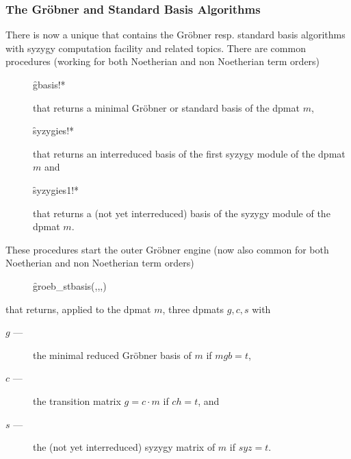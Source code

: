 \subsubsection{The Gr\"obner and Standard Basis Algorithms}

There is now a unique  that contains the Gr\"obner
resp. standard basis algorithms with syzygy computation facility and
related topics. There are common procedures (working for both
Noetherian and non Noetherian term orders)
\begin{description}

\item[]
  \begin{syntax}
    \f{gbasis!*} 
  \end{syntax}
  \hypertarget{procedure:GBASIS!*}{}
that returns a minimal Gr\"obner or standard basis of the dpmat $m$,

\item[]
  \begin{syntax}
    \f{syzygies!*} 
  \end{syntax}
  \hypertarget{procedure:SYZYGIES!*}{}
that returns an interreduced basis of the first syzygy module of
the dpmat $m$ and

\item[]
  \begin{syntax}
    \f{syzygies1!*} 
  \end{syntax}
  \hypertarget{procedure:SYZYGIES1!*}{}
that returns a (not yet interreduced) basis of the syzygy module
of the dpmat $m$.
\end{description}

These procedures start the outer Gr\"obner engine (now also common for both
Noetherian and non Noetherian term orders)
\begin{description}

\item[]
  \begin{syntax}
    \f{groeb\_stbasis}(,,,)
  \end{syntax}
  \hypertarget{procedure:GROEB_STBASIS}{}
\end{description}
that returns, applied to the dpmat $m$, three dpmats $g,c,s$ with
\begin{description}
\item[$g$ ---] the minimal reduced Gr\"obner basis of $m$ if $mgb=t$,

\item[$c$ ---] the transition matrix $g=c\cdot m$ if $ch=t$, and

\item[$s$ ---] the (not yet interreduced) syzygy matrix of $m$ if $syz=t$.
\end{description}

